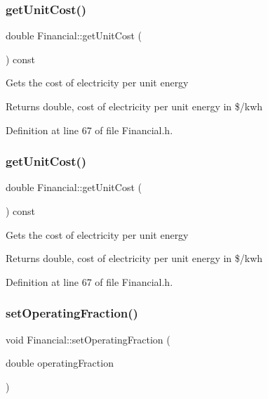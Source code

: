 \subsubsection{\texorpdfstring{get\+Unit\+Cost()}{getUnitCost()}\hspace{0.1cm}{\footnotesize\ttfamily [2/3]}}
{\footnotesize\ttfamily double Financial\+::get\+Unit\+Cost (\begin{DoxyParamCaption}{ }\end{DoxyParamCaption}) const\hspace{0.3cm}{\ttfamily [inline]}}

Gets the cost of electricity per unit energy

\begin{DoxyReturn}{Returns}
double, cost of electricity per unit energy in \$/kwh 
\end{DoxyReturn}


Definition at line 67 of file Financial.\+h.

\mbox{\label{class_financial_adc3092e8f4cfd065042638236d21eaf4}} 
\subsubsection{\texorpdfstring{get\+Unit\+Cost()}{getUnitCost()}\hspace{0.1cm}{\footnotesize\ttfamily [3/3]}}
{\footnotesize\ttfamily double Financial\+::get\+Unit\+Cost (\begin{DoxyParamCaption}{ }\end{DoxyParamCaption}) const\hspace{0.3cm}{\ttfamily [inline]}}

Gets the cost of electricity per unit energy

\begin{DoxyReturn}{Returns}
double, cost of electricity per unit energy in \$/kwh 
\end{DoxyReturn}


Definition at line 67 of file Financial.\+h.

\mbox{\label{class_financial_a966250111b2f7a00d797a9d153ee8a83}} 
\subsubsection{\texorpdfstring{set\+Operating\+Fraction()}{setOperatingFraction()}\hspace{0.1cm}{\footnotesize\ttfamily [1/3]}}
{\footnotesize\ttfamily void Financial\+::set\+Operating\+Fraction (\begin{DoxyParamCaption}\item[{double}]{operating\+Fraction }\end{DoxyParamCaption})\hspace{0.3cm}{\ttfamily [inline]}}

